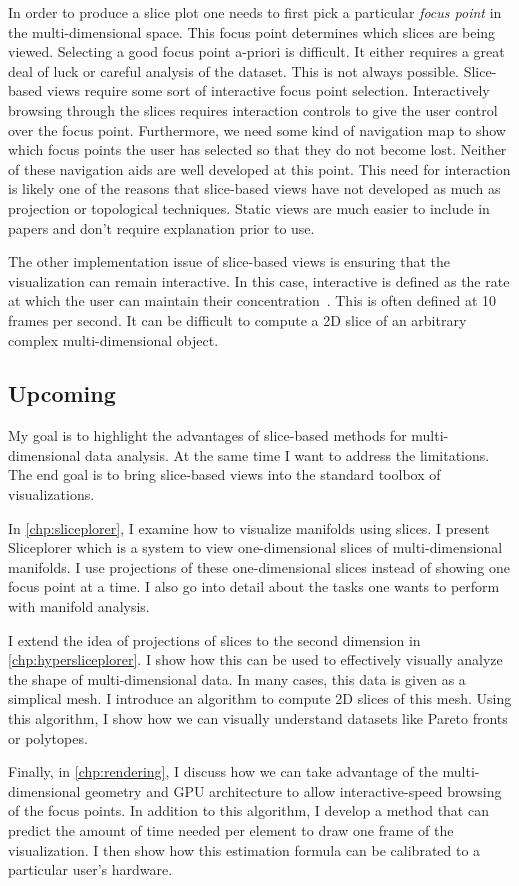 In order to produce a slice plot one needs to first pick a particular
\emph{focus point} in the multi-dimensional space. This focus point determines
which slices are being viewed. Selecting a good focus point a-priori is
difficult. 
It either requires a great deal of luck or careful analysis of the
dataset. This is not always possible. Slice-based views require some sort of
interactive focus point selection. Interactively browsing through the slices
requires interaction controls to give the user control over the focus point.
Furthermore, we need some kind of navigation map to show which focus points the
user has selected so that they do not become lost. Neither of these navigation
aids are well developed at this point. This need for interaction is likely one
of the reasons that slice-based views have not developed as much as projection
or topological techniques. Static views are much easier to include in papers
and don't require explanation prior to use.

The other implementation issue of slice-based views is ensuring that the
visualization can remain interactive. In this case, interactive is defined as
the rate at which the user can maintain their
concentration~\cite{Shneiderman:1987}. This is often defined at 10 frames per
second. It can be difficult to compute a 2D slice of an arbitrary complex
multi-dimensional object. 


\subsection{Upcoming}
\label{sec:thesis_outline}

My goal is to highlight the advantages of slice-based methods for
multi-dimensional data analysis. At the same time I want to address the
limitations. The end goal is to bring slice-based views into the standard
toolbox of visualizations.

In \autoref{chp:sliceplorer}, I examine how to visualize manifolds using
slices. I present Sliceplorer which is a system to view one-dimensional slices
of multi-dimensional manifolds. I use projections of these one-dimensional
slices instead of showing one focus point at a time. I also go into detail
about the tasks one wants to perform with manifold analysis.

I extend the idea of projections of slices to the second dimension in
\autoref{chp:hypersliceplorer}.  I show how this can be used to effectively
visually analyze the shape of multi-dimensional data. In many cases, this data
is given as a simplical mesh. I introduce an algorithm to compute 2D slices of
this mesh.  Using this algorithm, I show how we can visually understand
datasets like Pareto fronts or polytopes.

Finally, in \autoref{chp:rendering}, I discuss how we can take advantage of the
multi-dimensional geometry and GPU architecture to allow interactive-speed
browsing of the focus points. In addition to this algorithm, I develop a method
that can predict the amount of time needed per element to draw one frame of the
visualization. I then show how this estimation formula can be calibrated to a
particular user's hardware.


